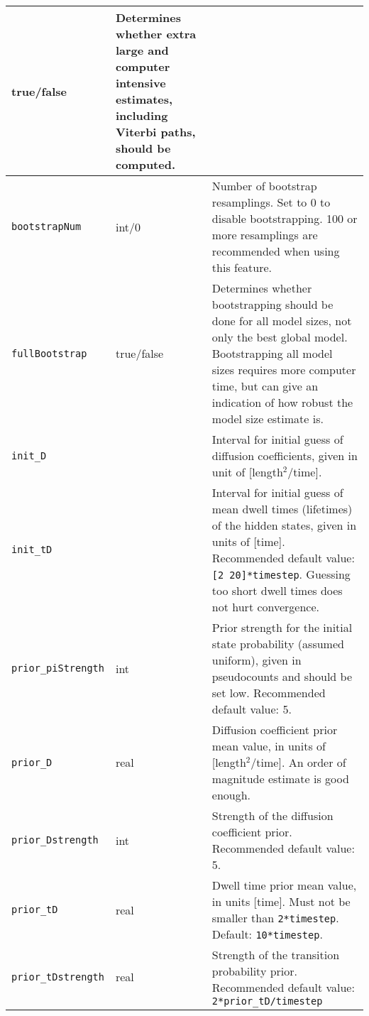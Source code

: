 \begin{longtable}{|m{}|>{\centering\arraybackslash}m{}|m{}|}
true/false & Determines whether extra large and computer intensive
estimates, including Viterbi paths, should be computed.\\[0.5ex]
\hline \texttt{bootstrapNum} & int/0 & Number of bootstrap
resamplings. Set to 0 to disable bootstrapping. 100 or more
resamplings are recommended when using this feature.\\ [0.5ex] \hline
\texttt{fullBootstrap} & true/false & Determines whether bootstrapping
should be done for all model sizes, not only the best global
model. Bootstrapping all model sizes requires more computer time, but
can give an indication of how robust the model size estimate
is.\\[0.5ex] \hline \texttt{init\_D } & [real real] & Interval for
initial guess of diffusion coefficients, given in unit of
[length$^2$/time]. \\ [0.5ex] \hline \texttt{init\_tD} & [real real] &
Interval for initial guess of mean dwell times (lifetimes) of the
hidden states, given in units of [time]. Recommended default value:
\mbox{\texttt{[2 20]*timestep}}. Guessing too short dwell times does
not hurt convergence.\\ [0.5ex] \hline \texttt{prior\_piStrength} &
int & Prior strength for the initial state probability (assumed
uniform), given in pseudocounts and should be set low. Recommended
default value: 5.\\ [0.5ex] \hline \texttt{prior\_D} & real &
Diffusion coefficient prior mean value, in units of
[length$^2$/time]. An order of magnitude estimate is good
enough.\\ [0.5ex] \hline \texttt{prior\_Dstrength} & int & Strength of
the diffusion coefficient prior. Recommended default value:
5.\\ [0.5ex] \hline \texttt{prior\_tD} & real & Dwell time prior mean
value, in units [time]. Must not be smaller than
\texttt{2*timestep}. Default: \texttt{10*timestep}. \\ [0.5ex] \hline
\texttt{prior\_tDstrength} & real & Strength of the transition
probability prior. Recommended default value:
\texttt{2*prior\_tD/timestep}\\ 
[1ex] %
\end{longtable}


\newpage

